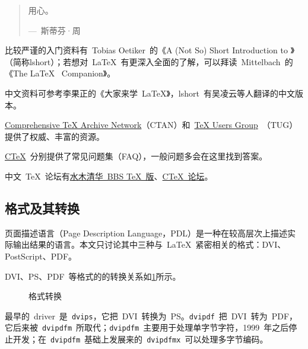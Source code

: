 \begin{quotation}
用心。
\begin{flushright}
---~斯蒂芬·周
\end{flushright}
\end{quotation}

比较严谨的入门资料有~Tobias Oetiker~的《A (Not So) Short Introduction to \LaTeXe》（简称lshort）；若想对~\LaTeX~有更深入全面的了解，可以拜读~Mittelbach~的《The \LaTeX~ Companion》。

中文资料可参考李果正的《大家来学~\LaTeX》，lshort~有吴凌云等人翻译的中文版本。

\href{http://www.ctan.org/}{Comprehensive TeX Archive Network}（CTAN）和~\href{http://www.tug.org/}{TeX Users Group}~（TUG）提供了权威、丰富的资源。

\href{http://www.ctex.org}{CTeX}~分别提供了常见问题集（FAQ），一般问题多会在这里找到答案。

中文~\TeX~论坛有\href{http://www.smth.org/bbsdoc.php?board=TeX}{水木清华~BBS TeX~版}、\href{http://bbs.ctex.org/}{CTeX~论坛}。

\subsection{格式及其转换}
页面描述语言（Page Description Language，PDL）是一种在较高层次上描述实际输出结果的语言。本文只讨论其中三种与~\LaTeX~紧密相关的格式：DVI、PostScript、PDF。

\label{subsec:convert_format}
DVI、PS、PDF~等格式的的转换关系如\ref{fig:convert_format}所示。

\begin{figure}[htbp]
\centering
{}
\caption{格式转换}
\label{fig:convert_format}
\end{figure}

最早的~driver~是~\verb|dvips|，它把~DVI~转换为~PS。\verb|dvipdf|~把~DVI~转为~PDF，它后来被~\verb|dvipdfm|~所取代；\verb|dvipdfm|~主要用于处理单字节字符，1999~年之后停止开发；在~\verb|dvipdfm|~基础上发展来的~\verb|dvipdfmx|~可以处理多字节编码。

